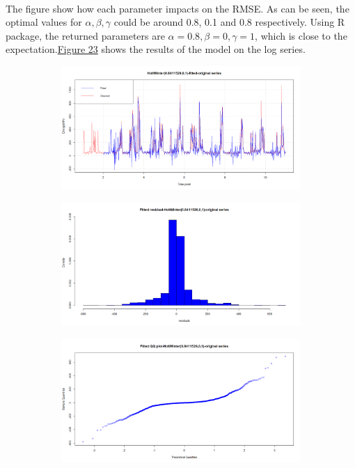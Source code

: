 \documentclass[12pt]{article}
\begin{document}
\paragraph{}
The figure show how each parameter impacts on the RMSE. As can be seen, the optimal values for $\alpha, \beta, \gamma$ could be around 0.8, 0.1 and 0.8 respectively. Using R package, the returned parameters are $\alpha=0.8,\beta=0,\gamma=1$, which is close to the expectation.\href{figure23}{Figure 23} shows the results of the model on the log series.
\begin{figure}[H]
  \centering
  \begin{subfigure}[b]{0.49\linewidth}
    \includegraphics[width=\linewidth]{figure23-1.png}
  \end{subfigure}
  \begin{subfigure}[b]{0.49\linewidth}
    \includegraphics[width=\linewidth]{figure23-2.png}
  \end{subfigure}
  \begin{subfigure}[b]{0.49\linewidth}
    \includegraphics[width=\linewidth]{figure23-3.png}

\end{subfigure}
\end{figure}
\end{document}
